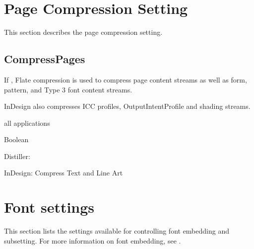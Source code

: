 \documentclass[letterpaper,12pt,english,openany,oneside]{sphinxmanual}
\begin{document}
\begin{sphinxVerbatim}[commandchars=\\\{\}]
\end{sphinxVerbatim}




\section{Page Compression Setting}
\label{\detokenize{PDF_Create_CommonSettings:page-compression-setting}}
This section describes the page compression setting.




\subsection{CompressPages}
\label{\detokenize{PDF_Create_CommonSettings:compresspages}}
If  , Flate compression is used to compress page content streams as well as form, pattern, and Type 3 font content streams.

InDesign also compresses ICC profiles, OutputIntentProfile and shading streams.

\label{\detokenize{PDF_Create_CommonSettings:supported-by-66}}

all applications

\label{\detokenize{PDF_Create_CommonSettings:type-66}}

Boolean

\label{\detokenize{PDF_Create_CommonSettings:ui-name-52}}

Distiller: 

InDesign: Compress Text and Line Art

\label{\detokenize{PDF_Create_CommonSettings:default-value-62}}

\begin{sphinxVerbatim}[commandchars=\\\{\}]
\end{sphinxVerbatim}




\section{Font settings}
\label{\detokenize{PDF_Create_CommonSettings:font-settings}}
This section lists the settings available for controlling font embedding and subsetting. For more information on font embedding, see .
\end{document}
